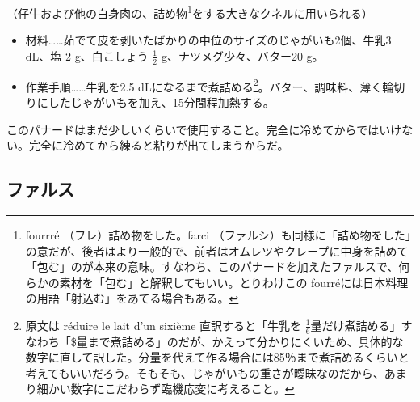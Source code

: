 \begin{recette}


（仔牛および他の白身肉の、詰め物\footnote{fourrré
  （フレ）詰め物をした。farci
  （ファルシ）も同様に「詰め物をした」の意だが、後者はより一般的で、前者はオムレツやクレープに中身を詰めて「包む」のが本来の意味。すなわち、このパナードを加えたファルスで、何らかの素材を「包む」と解釈してもいい。とりわけこの
  fourréには日本料理の用語「射込む」をあてる場合もある。}をする大きなクネルに用いられる）

\begin{itemize}
\item
  材料\ldots{}\ldots{}茹でて皮を剥いたばかりの中位のサイズのじゃがいも2個、牛乳3
  dL、塩 2 g、白こしょう \(\frac{1}{2}\) g、ナツメグ少々、バター20 g。
\item
  作業手順\ldots{}\ldots{}牛乳を2.5 dLになるまで煮詰める\footnote{原文は
    réduire le lait d'un sixième 直訳すると「牛乳を
    \(\frac{1}{6}\)量だけ煮詰める」すなわち「\$量まで煮詰める」のだが、かえって分かりにくいため、具体的な数字に直して訳した。分量を代えて作る場合には85％まで煮詰めるくらいと考えてもいいだろう。そもそも、じゃがいもの重さが曖昧なのだから、あまり細かい数字にこだわらず臨機応変に考えること。}。バター、調味料、薄く輪切りにしたじゃがいもを加え、15分間程加熱する。
\end{itemize}

このパナードはまだ少しいくらいで使用すること。完全に冷めてからではいけない。完全に冷めてから練ると粘りが出てしまうからだ。
\end{recette}
\hypertarget{farces}{%
\subsection{ファルス}\label{farces}}


 

